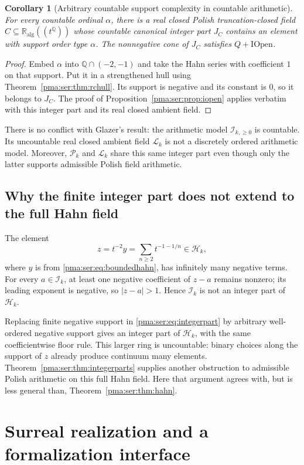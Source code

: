 \documentclass[11pt]{article}
\numberwithin{equation}{section}
\newtheorem{corollary}[corollary]{Corollary}
\theoremstyle{definition}
\theoremstyle{remark}
\newcommand{\Q}{\mathbb Q}
\newcommand{\ka}{\mathbb R_{\mathrm{alg}}}
\newcommand{\Pk}{\mathcal P_k}
\newcommand{\Lk}{\mathcal L_k}
\newcommand{\Hk}{\mathcal H_k}
\newcommand{\Ik}{\mathcal I_k}
\begin{document}
\begin{corollary}[Arbitrary countable support complexity in countable arithmetic]
For every countable ordinal $\alpha$, there is a real closed Polish
truncation-closed field $C\subseteq\ka((t^\Q))$ whose countable canonical
integer part $J_C$ contains an element with support order type $\alpha$.
The nonnegative cone of $J_C$ satisfies $Q+\mathrm{IOpen}$.
\end{corollary}
\begin{proof}
Embed $\alpha$ into $\Q\cap(-2,-1)$ and take the Hahn series with coefficient
$1$ on that support. Put it in a strengthened hull using
Theorem~\ref{pma:ser:thm:rchull}. Its support is negative and its constant is $0$,
so it belongs to $J_C$. The proof of Proposition~\ref{pma:ser:prop:iopen} applies
verbatim with this integer part and its real closed ambient field.
\end{proof}

There is no conflict with Glazer's result: the arithmetic model
$\mathcal I_{k,\geq0}$ is countable. Its uncountable real closed ambient field
$\Lk$ is not a discretely ordered arithmetic model. Moreover, $\Pk$ and
$\Lk$ share this same integer part even though only the latter supports
admissible Polish field arithmetic.

\subsection{Why the finite integer part does not extend to the full Hahn field}

The element
\[
 z=t^{-2}y=\sum_{n\geq2}t^{-1-1/n}\in\Hk,
\]
where $y$ is from \eqref{pma:ser:eq:boundedhahn}, has infinitely many negative terms.
For every $a\in\Ik$, at least one negative coefficient of $z-a$ remains
nonzero; its leading exponent is negative, so $|z-a|>1$. Hence $\Ik$ is
not an integer part of $\Hk$.

Replacing finite negative support in \eqref{pma:ser:eq:integerpart} by arbitrary
well-ordered negative support gives an integer part of $\Hk$, with the
same coefficientwise floor rule. This larger ring is uncountable: binary
choices along the support of $z$ already produce continuum many elements.
Theorem~\ref{pma:ser:thm:integerparts} supplies another obstruction to admissible
Polish arithmetic on this full Hahn field. Here that argument agrees with,
but is less general than, Theorem~\ref{pma:ser:thm:hahn}.

\section{Surreal realization and a formalization interface}
\label{pma:ser:sec:surreal}
\end{document}
